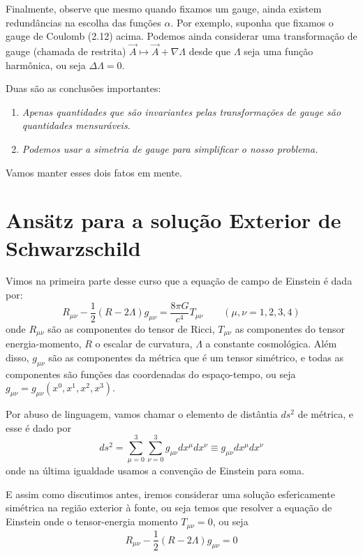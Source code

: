 \documentclass[11pt]{article}
\begin{document}
Finalmente, observe que mesmo quando fixamos um gauge, ainda existem
redundâncias na escolha das funções \(\alpha\). Por exemplo, suponha que
fixamos o gauge de Coulomb (2.12) acima. Podemos ainda considerar uma
transformação de gauge (chamada de restrita)
\(\vec{A}\mapsto \vec{A} + \nabla \Lambda\) desde que \(\Lambda\) seja
uma função harmônica, ou seja \(\Delta \Lambda = 0\).

Duas são as conclusões importantes:

\begin{enumerate}
\def\labelenumi{\arabic{enumi})}
\item
  \emph{Apenas quantidades que são invariantes pelas transformações de
  gauge são quantidades mensuráveis.}
\item
  \emph{Podemos usar a simetria de gauge para simplificar o nosso
  problema.}
\end{enumerate}

Vamos manter esses dois fatos em mente.

    \hypertarget{ansuxe4tz-para-a-soluuxe7uxe3o-exterior-de-schwarzschild}{%
\section{Ansätz para a solução Exterior de
Schwarzschild}\label{ansuxe4tz-para-a-soluuxe7uxe3o-exterior-de-schwarzschild}}

    Vimos na primeira parte desse curso que a equação de campo de Einstein é
dada por:
\[ \tag{3.1} R_{\mu\nu} - \frac{1}{2} (R - 2 \Lambda) g_{\mu\nu} = \frac{8 \pi G}{c^4} T_{\mu\nu} \qquad (\mu, \nu = 1,2,3,4)\]
onde \(R_{\mu\nu}\) são as componentes do tensor de Ricci,
\(T_{\mu\nu}\) as componentes do tensor energia-momento, \(R\) o escalar
de curvatura, \(\Lambda\) a constante cosmológica. Além disso,
\(g_{\mu\nu}\) são as componentes da métrica que é um tensor simétrico,
e todas as componentes são funções das coordenadas do espaço-tempo, ou
seja \(g_{\mu\nu}=g_{\mu\nu}(x^0, x^1, x^2, x^3)\).

Por abuso de linguagem, vamos chamar o elemento de distântia \(ds^2\) de
métrica, e esse é dado por
\[ \tag{3.2} ds^2 = \sum_{\mu=0}^3 \sum_{\nu=0}^3 g_{\mu\nu} dx^\mu dx^\nu  \equiv  g_{\mu\nu} dx^\mu dx^\nu \]
onde na última igualdade usamos a convenção de Einstein para soma.

E assim como discutimos antes, iremos considerar uma solução
esfericamente simétrica na região exterior à fonte, ou seja temos que
resolver a equação de Einstein onde o tensor-energia momento
\(T_{\mu\nu} = 0\), ou seja
\[ \tag{3.3.a} R_{\mu\nu} - \frac{1}{2} (R - 2 \Lambda) g_{\mu\nu} = 0 \]
\end{document}
